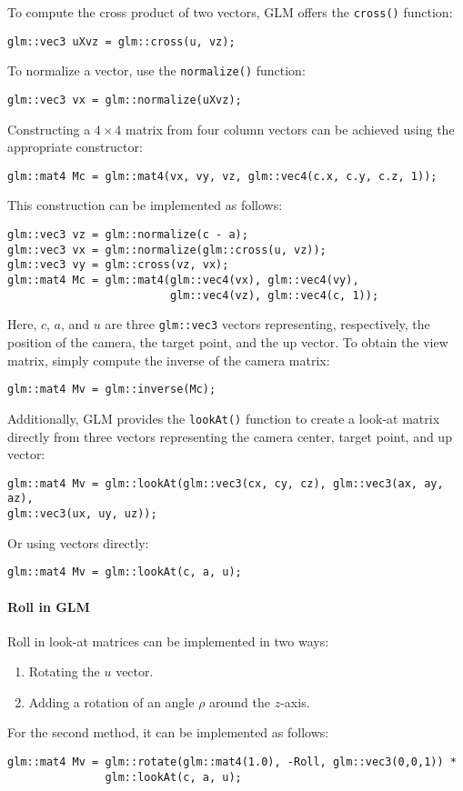 To compute the cross product of two vectors, GLM offers the \texttt{cross()} function:
\begin{verbatim}
glm::vec3 uXvz = glm::cross(u, vz);
\end{verbatim}
To normalize a vector, use the \texttt{normalize()} function:
\begin{verbatim}
glm::vec3 vx = glm::normalize(uXvz);
\end{verbatim}
Constructing a $4 \times 4$ matrix from four column vectors can be achieved using the appropriate constructor:
\begin{verbatim}
glm::mat4 Mc = glm::mat4(vx, vy, vz, glm::vec4(c.x, c.y, c.z, 1));
\end{verbatim}
This construction can be implemented as follows:
\begin{verbatim}
glm::vec3 vz = glm::normalize(c - a);
glm::vec3 vx = glm::normalize(glm::cross(u, vz));
glm::vec3 vy = glm::cross(vz, vx);
glm::mat4 Mc = glm::mat4(glm::vec4(vx), glm::vec4(vy), 
                         glm::vec4(vz), glm::vec4(c, 1));
\end{verbatim}
Here, $c$, $a$, and $u$ are three \texttt{glm::vec3} vectors representing, respectively, the position of the camera, the target point, and the up vector. 
To obtain the view matrix, simply compute the inverse of the camera matrix:
\begin{verbatim}
glm::mat4 Mv = glm::inverse(Mc);
\end{verbatim}

Additionally, GLM provides the \texttt{lookAt()} function to create a look-at matrix directly from three vectors representing the camera center, target point, and up vector:
\begin{verbatim}
glm::mat4 Mv = glm::lookAt(glm::vec3(cx, cy, cz), glm::vec3(ax, ay, az),
glm::vec3(ux, uy, uz));
\end{verbatim}
Or using vectors directly:
\begin{verbatim}
glm::mat4 Mv = glm::lookAt(c, a, u);
\end{verbatim}

\paragraph*{Roll in GLM}
Roll in look-at matrices can be implemented in two ways:
\begin{enumerate}
    \item Rotating the $u$ vector.
    \item Adding a rotation of an angle $\rho$ around the $z$-axis.
\end{enumerate}
For the second method, it can be implemented as follows:
\begin{verbatim}
glm::mat4 Mv = glm::rotate(glm::mat4(1.0), -Roll, glm::vec3(0,0,1)) *
               glm::lookAt(c, a, u);
\end{verbatim}

